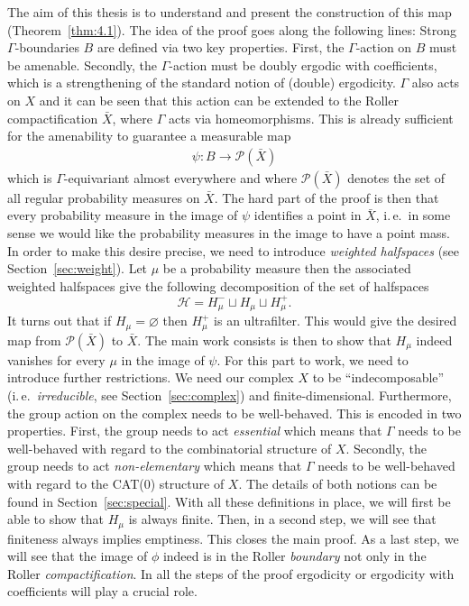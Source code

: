 The aim of this thesis is to understand and present the construction of this map (Theorem~\ref{thm:4.1}). The idea of the proof goes along the following lines: Strong \(\Gamma\)-boundaries \(B\) are defined via two key properties. First, the \(\Gamma\)-action on \(B\) must be amenable. Secondly, the \(\Gamma\)-action must be doubly ergodic with coefficients, which is a strengthening of the standard notion of (double) ergodicity. \(\Gamma\) also acts on \(X\) and it can be seen that this action can be extended to the Roller compactification \(\bar X\), where \(\Gamma\) acts via homeomorphisms. This is already sufficient for the amenability to guarantee a measurable map
\begin{align}
  \psi\colon B \to \mathcal{P}(\bar X)\label{eq:psi}
\end{align}
which is \(\Gamma\)-equivariant almost everywhere and where \(\mathcal{P}(\bar X)\) denotes the set of all regular probability measures on \(\bar X\). The hard part of the proof is then that every probability measure in the image of \(\psi\) identifies a point in \(\bar X\), i.\,e.\ in some sense we would like the probability measures in the image to have a point mass. In order to make this desire precise, we need to introduce \emph{weighted halfspaces} (see Section~\ref{sec:weight}). Let \(\mu\) be a probability measure then the associated weighted halfspaces give the following decomposition of the set of halfspaces
\[
\mathcal{H} = H_\mu^- \sqcup H_\mu \sqcup H_\mu^+.
\]
It turns out that if \(H_\mu = \varnothing\) then \(H_\mu^+\) is an ultrafilter. This would give the desired map from \(\mathcal{P}(\bar X)\) to \(\bar X\). The main work consists is then to show that \(H_\mu\) indeed vanishes for every \(\mu\) in the image of \(\psi\). For this part to work, we need to introduce further restrictions. We need our complex \(X\) to be \enquote{indecomposable} (i.\,e.\ \emph{irreducible}, see Section~\ref{sec:complex}) and finite-dimensional. Furthermore, the group action on the complex needs to be well-behaved. This is encoded in two properties. First, the group needs to act \emph{essential} which means that \(\Gamma\) needs to be well-behaved with regard to the combinatorial structure of \(X\). Secondly, the group needs to act \emph{non-elementary} which means that \(\Gamma\) needs to be well-behaved with regard to the CAT(0) structure of \(X\). The details of both notions can be found in Section~\ref{sec:special}. With all these definitions in place, we will first be able to show that \(H_\mu\) is always finite. Then, in a second step, we will see that finiteness always implies emptiness. This closes the main proof. As a last step, we will see that the image of \(\phi\) indeed is in the Roller \emph{boundary} not only in the Roller \emph{compactification}. In all the steps of the proof ergodicity or ergodicity with coefficients will play a crucial role.


